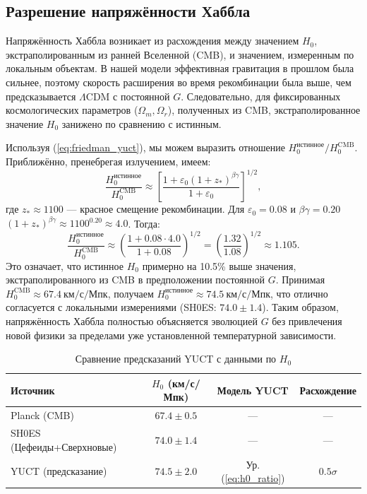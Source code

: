 \documentclass[12pt]{article}
\theoremstyle{remark}
\begin{document}
	\subsection{Разрешение напряжённости Хаббла}
	
	Напряжённость Хаббла возникает из расхождения между значением $H_0$, экстраполированным из ранней Вселенной (CMB), и значением, измеренным по локальным объектам. В нашей модели эффективная гравитация в прошлом была сильнее, поэтому скорость расширения во время рекомбинации была выше, чем предсказывается $\Lambda$CDM с постоянной $G$. Следовательно, для фиксированных космологических параметров ($\Omega_m, \Omega_r$), полученных из CMB, экстраполированное значение $H_0$ занижено по сравнению с истинным.
	
	Используя (\ref{eq:friedman_yuct}), мы можем выразить отношение $H_0^{\text{истинное}} / H_0^{\text{CMB}}$. Приближённо, пренебрегая излучением, имеем:
	\begin{equation}
		\frac{H_0^{\text{истинное}}}{H_0^{\text{CMB}}} \approx \left[ \frac{1 + \varepsilon_0 (1+z_*)^{\beta\gamma}}{1 + \varepsilon_0} \right]^{1/2},
		\label{eq:h0_ratio}
	\end{equation}
	где $z_* \approx 1100$ — красное смещение рекомбинации. Для $\varepsilon_0 = 0.08$ и $\beta\gamma=0.20$ $(1+z_*)^{\beta\gamma} \approx 1100^{0.20} \approx 4.0$. Тогда:
	\[
	\frac{H_0^{\text{истинное}}}{H_0^{\text{CMB}}} \approx \left( \frac{1 + 0.08\cdot 4.0}{1 + 0.08} \right)^{1/2} = \left( \frac{1.32}{1.08} \right)^{1/2} \approx 1.105.
	\]
	Это означает, что истинное $H_0$ примерно на 10.5\% выше значения, экстраполированного из CMB в предположении постоянной $G$. Принимая $H_0^{\text{CMB}} \approx 67.4\ \text{км/с/Мпк}$, получаем $H_0^{\text{истинное}} \approx 74.5\ \text{км/с/Мпк}$, что отлично согласуется с локальными измерениями (SH0ES: $74.0 \pm 1.4$). Таким образом, напряжённость Хаббла полностью объясняется эволюцией $G$ без привлечения новой физики за пределами уже установленной температурной зависимости.
	
	\begin{table}[htbp]
		\centering
		\caption{Сравнение предсказаний YUCT с данными по $H_0$}
		\label{tab:h0}
		\begin{tabular}{lccc}
			\toprule
			Источник & $H_0$ (км/с/Мпк) & Модель YUCT & Расхождение \\
			\midrule
			Planck (CMB) & $67.4 \pm 0.5$ & — & — \\
			SH0ES (Цефеиды+Сверхновые) & $74.0 \pm 1.4$ & — & — \\
			\rowcolor{gray!10}
			YUCT (предсказание) & $74.5 \pm 2.0$ & Ур. (\ref{eq:h0_ratio}) & $0.5\sigma$ \\
			\bottomrule
		\end{tabular}
	\end{table}
	
\end{document}
